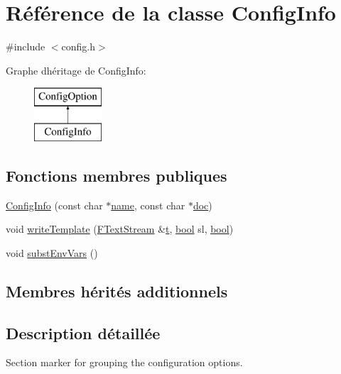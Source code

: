 \hypertarget{class_config_info}{}\section{Référence de la classe Config\+Info}
\label{class_config_info}


{\ttfamily \#include $<$config.\+h$>$}

Graphe d\textquotesingle{}héritage de Config\+Info\+:\begin{figure}[H]
\begin{center}
\leavevmode
\includegraphics[height=2.000000cm]{class_config_info}
\end{center}
\end{figure}
\subsection*{Fonctions membres publiques}
\begin{DoxyCompactItemize}
\item 
\hyperlink{class_config_info_ab6f35b01ca89e544443687839171a835}{Config\+Info} (const char $\ast$\hyperlink{class_config_option_a2f226c32b0c447c1fa628660f42859c4}{name}, const char $\ast$\hyperlink{vhdljjparser_8cpp_a9910424bf5401d657c3b3fdff6fcc152}{doc})
\item 
void \hyperlink{class_config_info_a8effa474d1ed0481ad0bdd506cffcc63}{write\+Template} (\hyperlink{class_f_text_stream}{F\+Text\+Stream} \&\hyperlink{058__bracket__recursion_8tcl_a69e959f6901827e4d8271aeaa5fba0fc}{t}, \hyperlink{qglobal_8h_a1062901a7428fdd9c7f180f5e01ea056}{bool} sl, \hyperlink{qglobal_8h_a1062901a7428fdd9c7f180f5e01ea056}{bool})
\item 
void \hyperlink{class_config_info_ac8e7248d13bb1c291c9e1547ff1a1fa0}{subst\+Env\+Vars} ()
\end{DoxyCompactItemize}
\subsection*{Membres hérités additionnels}


\subsection{Description détaillée}
Section marker for grouping the configuration options. 

